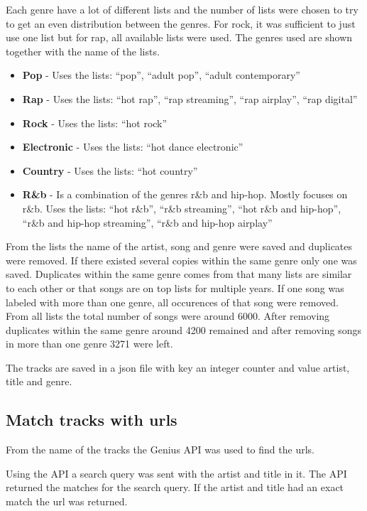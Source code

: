 \documentclass[a4paper, 12pt]{article}
\begin{document}
Each genre have a lot of different lists and the number of lists were chosen to try to get an even distribution between the genres. For rock, it was sufficient to just use one list but for rap, all available lists were used.
The genres used are shown together with the name of the lists.
\begin{itemize}
    \item {\textbf{Pop} - Uses the lists: ``pop'', ``adult pop'', ``adult contemporary''}
    \item {\textbf{Rap} - Uses the lists: ``hot rap'', ``rap streaming'', ``rap airplay'', ``rap digital''}
    \item {\textbf{Rock} - Uses the lists: ``hot rock''}
    \item {\textbf{Electronic} - Uses the lists: ``hot dance electronic''}
    \item {\textbf{Country} - Uses the lists: ``hot country''}
    \item {\textbf{R\&b} - Is a combination of the genres r\&b and hip-hop. Mostly focuses on r\&b. Uses the lists: ``hot r\&b'', ``r\&b streaming'', ``hot r\&b and hip-hop'', ``r\&b and hip-hop streaming'', ``r\&b and hip-hop airplay''}
\end{itemize}

From the lists the name of the artist, song and genre were saved and duplicates were removed.
If there existed several copies within the same genre only one was saved.
Duplicates within the same genre comes from that many lists are similar to each other or that songs are on top lists for multiple years.
If one song was labeled with more than one genre, all occurences of that song were removed.
From all lists the total number of songs were around 6000.
After removing duplicates within the same genre around 4200 remained and after removing songs in more than one genre 3271 were left.

The tracks are saved in a json file with key an integer counter and value artist, title and genre.

\subsection{Match tracks with urls}
From the name of the tracks the Genius API was used to find the urls. \cite{genius}

Using the API a search query was sent with the artist and title in it.
The API returned the matches for the search query.
If the artist and title had an exact match the url was returned.
\end{document}
